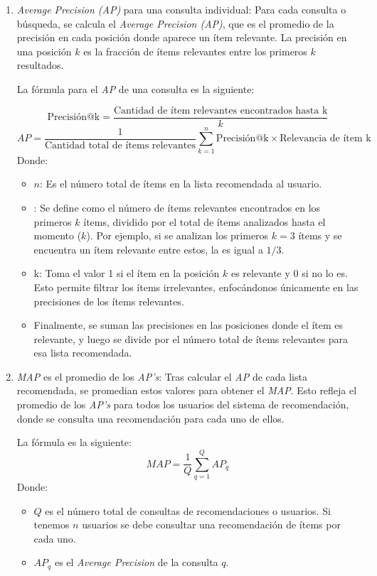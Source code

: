 \documentclass[11pt,a4paper,twoside]{thesis}
\begin{document}
\begin{enumerate}
	\item \textit{Average Precision (AP)} para una consulta individual: Para cada consulta o búsqueda, se calcula el \textit{Average Precision (AP)}, que es el promedio de la precisión en cada posición donde aparece un ítem relevante. La precisión en una posición \( k \) es la fracción de ítems relevantes entre los primeros \( k \) resultados.

	      La fórmula para el \textit{AP} de una consulta es la siguiente:

	      \[
		      \text{Precisión@k} = \frac{\text{Cantidad de ítem relevantes encontrados hasta k}}{k}
	      \]
	      \[
		      AP = \frac{1}{\text{Cantidad total de ítems relevantes}} \sum_{k=1}^{n} \text{Precisión@k} \times \text{Relevancia de ítem k}
	      \]
	      Donde:
	      \begin{itemize}
		      \item $n$: Es el número total de ítems en la lista recomendada al usuario.
		      \item {}: Se define como el número de ítems relevantes encontrados en los primeros \( k \) ítems, dividido por el total de ítems analizados hasta el momento ($k$). Por ejemplo, si se analizan los primeros \( k=3 \) ítems y se encuentra un ítem relevante entre estos, la  es igual a \( 1/3 \).
		      \item {} k: Toma el valor 1 si el ítem en la posición \( k \) es relevante y $0$ si no lo es. Esto permite filtrar los ítems irrelevantes, enfocándonos únicamente en las precisiones de los ítems relevantes.
		      \item Finalmente, se suman las precisiones en las posiciones donde el ítem es relevante, y luego se divide por el número total de ítems relevantes para esa lista recomendada.
	      \end{itemize}

	\item \textit{MAP} es el promedio de los \textit{AP's}: Tras calcular el \textit{AP} de cada lista recomendada, se promedian estos valores para obtener el \textit{MAP}. Esto refleja el promedio de los \textit{AP's} para todos los usuarios del sistema de recomendación, donde se consulta una recomendación para cada uno de ellos.

	      La fórmula es la siguiente:
	      \[
		      MAP = \frac{1}{Q} \sum_{q=1}^{Q} AP_q
	      \]
	      Donde:
	      \begin{itemize}
		      \item \( Q \) es el número total de consultas de recomendaciones o usuarios. Si tenemos $n$ usuarios se debe consultar una recomendación de ítems por cada uno.
		      \item \( AP_q \) es el \textit{Average Precision} de la consulta \( q \).
	      \end{itemize}
\end{enumerate}
\end{document}
